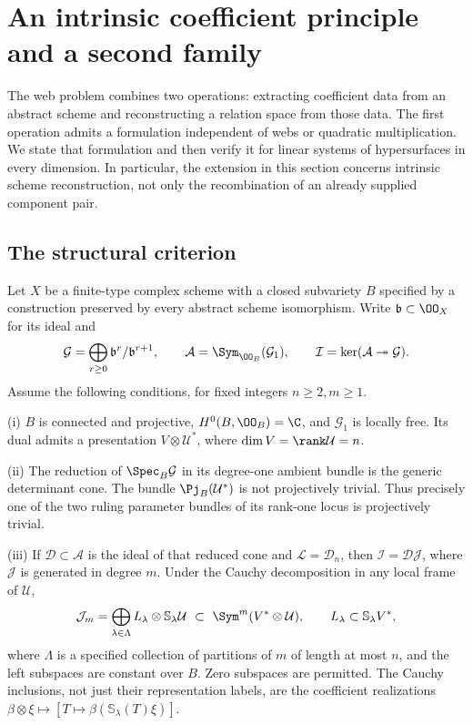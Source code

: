 \section{An intrinsic coefficient principle and a second family}
\label{sec:structural-coefficient-principle}

The web problem combines two operations: extracting coefficient data
from an abstract scheme and reconstructing a relation space from those
data.  The first operation admits a formulation independent of webs or
quadratic multiplication.  We state that formulation and then verify it
for linear systems of hypersurfaces in every dimension.  In particular,
the extension in this section concerns intrinsic scheme reconstruction,
not only the recombination of an already supplied component pair.

\subsection{The structural criterion}

Let \(X\) be a finite-type complex scheme with a closed subvariety
\(B\) specified by a construction preserved by every abstract scheme
isomorphism.  Write \(\mathfrak b\subset\OO_X\) for its ideal and
\[
 \mathcal G=\bigoplus_{r\ge0}\mathfrak b^r/\mathfrak b^{r+1},
 \qquad \mathcal A=\Sym_{\OO_B}(\mathcal G_1),
 \qquad \mathcal I=\ker(\mathcal A\twoheadrightarrow\mathcal G).
\]
Assume the following conditions, for fixed integers \(n\ge2,m\ge1\).

\smallskip
\noindent\textup{(i)} \(B\) is connected and projective,
\(H^0(B,\OO_B)=\C\), and \(\mathcal G_1\) is locally free.
Its dual admits a presentation \(V\otimes\mathcal U^*\), where
\(\dim V=\rank\mathcal U=n\).

\smallskip
\noindent\textup{(ii)} The reduction of \(\Spec_B\mathcal G\)
in its degree-one ambient bundle is the generic determinant cone.
The bundle \(\Pj_B(\mathcal U^*)\) is not projectively trivial.
Thus precisely one of the two ruling parameter bundles of its rank-one
locus is projectively trivial.

\smallskip
\noindent\textup{(iii)} If \(\mathcal D\subset\mathcal A\)
is the ideal of that reduced cone and \(\mathcal L=\mathcal D_n\),
then \(\mathcal I=\mathcal D\mathcal J\), where
\(\mathcal J\) is generated in degree \(m\).  Under the Cauchy
decomposition in any local frame of \(\mathcal U\),
\begin{equation}\label{eq:structural-coefficient-hypothesis}
 \mathcal J_m=
 \bigoplus_{\lambda\in\Lambda}
          L_\lambda\otimes\mathbb S_\lambda\mathcal U
 \ \subset\
 \Sym^m(V^*\otimes\mathcal U),
 \qquad L_\lambda\subset\mathbb S_\lambda V^*,
\end{equation}
where \(\Lambda\) is a specified collection of partitions of \(m\)
of length at most \(n\), and the left subspaces are constant over
\(B\).  Zero subspaces are permitted.  The Cauchy inclusions, not
just their representation labels, are the coefficient realizations
\(\beta\otimes\xi\mapsto[T\mapsto\beta(\mathbb S_\lambda(T)\xi)]\).

